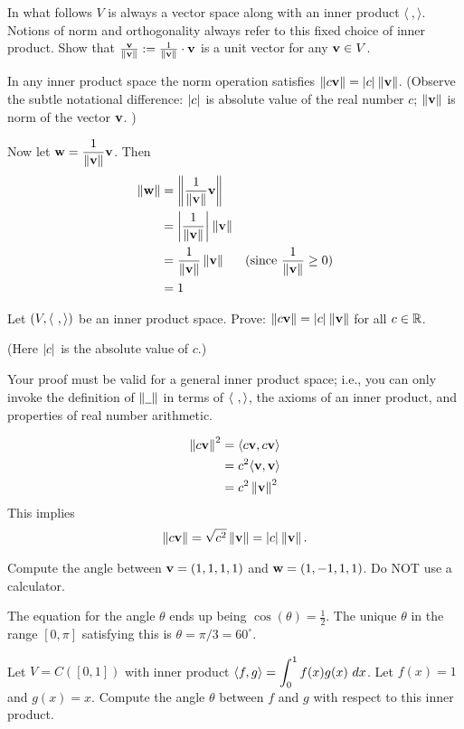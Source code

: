 In what follows $V$ is always a vector space along with an inner product $\langle \ , \rangle$. Notions of norm and orthogonality always refer to this fixed choice of inner product. 
\bb
\ii Show that $\frac{{\mathbf v}}{\left\lVert{\mathbf v}\right\rVert}:=\frac{1}{\left\lVert{\mathbf v}\right\rVert}\cdot{\mathbf v}$ is a unit vector for any ${\mathbf v}\in V$. 
\\
\begin{solution}
In any inner product space the norm operation satisfies $\left\lVert c{\mathbf v}\right\rVert=\left\lvert c\right\rvert_{}\left\lVert{\mathbf v}\right\rVert$. (Observe the subtle notational difference: $\left\lvert c\right\rvert_{}$ is absolute value of the real number $c$; $\left\lVert{\mathbf v}\right\rVert$ is norm of the vector ${\mathbf v}$. )

Now let $\displaystyle{\mathbf w}=\frac{1}{\left\lVert{\mathbf v}\right\rVert}{\mathbf v}$. Then 
\begin{align*}
\left\lVert{\mathbf w}\right\rVert&=\left\lVert\frac{1}{\left\lVert{\mathbf v}\right\rVert}{\mathbf v}\right\rVert\\
&=\left\lvert \frac{1}{\left\lVert{\mathbf v}\right\rVert}\right\rvert_{}\left\lVert{\mathbf v}\right\rVert\\
&=\frac{1}{\left\lVert{\mathbf v}\right\rVert}\left\lVert{\mathbf v}\right\rVert &\text{(since $\displaystyle\frac{1}{\left\lVert{\mathbf v}\right\rVert}\geq 0$)}\\
&=1
\end{align*}
\end{solution}

\ii Let $(V, \langle  \ , \rangle)$ be an inner product space. Prove: $\left\lVert c{\mathbf v}\right\rVert=\left\lvert c\right\rvert_{}\left\lVert{\mathbf v}\right\rVert$ for all $c\in {\mathbb R}$. 

(Here $\left\lvert c\right\rvert_{}$ is the absolute value of $c$.) 

Your proof must be valid for a general inner product space; i.e., you can only invoke the definition of $\left\lVert \underline{\hspace{5pt}}\right\rVert$ in terms of $\langle \ , \rangle$, the axioms of an inner product, and properties of real number arithmetic. 
\\
\begin{solution}
 \begin{align*}
  \left\lVert c{\mathbf v}\right\rVert^2&=\langle c{\mathbf v}, c{\mathbf v}\rangle\\
  &=c^2\langle {\mathbf v}, {\mathbf v}\rangle\\
  &=c^2\left\lVert{\mathbf v}\right\rVert^2
 \end{align*} 
 This implies 
 \[
 \left\lVert c{\mathbf v}\right\rVert=\sqrt{c^2}\left\lVert{\mathbf v}\right\rVert=\left\lvert c\right\rvert_{}\left\lVert{\mathbf v}\right\rVert.
 \]
\end{solution} 


\ii Compute the angle between ${\mathbf v}=(1,1,1,1)$ and ${\mathbf w}=(1,-1,1,1)$. Do NOT use a calculator. 
\begin{solution}
The equation for the angle $\theta$ ends up being $\cos(\theta)=\frac{1}{2}$. The unique $\theta$ in the range $[0,\pi]$ satisfying this is $\theta=\pi/3=60^\circ$.
\end{solution}
\ii Let $V=C([0,1])$ with inner product $\displaystyle \langle  f, g\rangle=\int_0^1f(x)g(x) \ dx$. Let $f(x)=1$ and $g(x)=x$. Compute the angle $\theta$ between $f$ and $g$ with respect to this inner product. 

